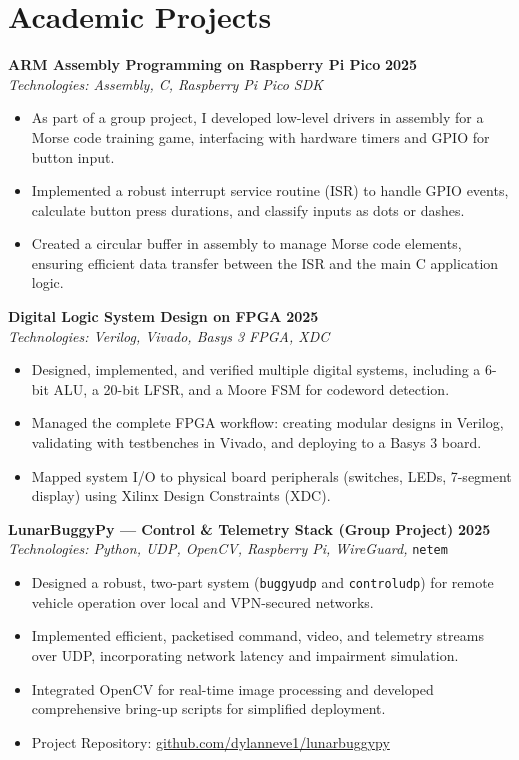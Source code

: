 \documentclass[10pt,a4paper]{article}
\begin{document}
\section*{Academic Projects}
\textbf{ARM Assembly Programming on Raspberry Pi Pico} \hfill \textbf{2025} \\
\textit{Technologies: Assembly, C, Raspberry Pi Pico SDK}
\begin{itemize}
    \item As part of a group project, I developed low-level drivers in assembly for a Morse code training game, interfacing with hardware timers and GPIO for button input.
    \item Implemented a robust interrupt service routine (ISR) to handle GPIO events, calculate button press durations, and classify inputs as dots or dashes.
    \item Created a circular buffer in assembly to manage Morse code elements, ensuring efficient data transfer between the ISR and the main C application logic.
\end{itemize}
\medskip
\textbf{Digital Logic System Design on FPGA} \hfill \textbf{2025} \\
\textit{Technologies: Verilog, Vivado, Basys 3 FPGA, XDC}
\begin{itemize}
    \item Designed, implemented, and verified multiple digital systems, including a 6-bit ALU, a 20-bit LFSR, and a Moore FSM for codeword detection.
    \item Managed the complete FPGA workflow: creating modular designs in Verilog, validating with testbenches in Vivado, and deploying to a Basys 3 board.
    \item Mapped system I/O to physical board peripherals (switches, LEDs, 7-segment display) using Xilinx Design Constraints (XDC).
\end{itemize}
\medskip
\textbf{LunarBuggyPy --- Control \& Telemetry Stack (Group Project)} \hfill \textbf{2025} \\
\textit{Technologies: Python, UDP, OpenCV, Raspberry Pi, WireGuard,} \texttt{netem}
\begin{itemize}
    \item Designed a robust, two-part system (\texttt{buggyudp} and \texttt{controludp}) for remote vehicle operation over local and VPN-secured networks.
    \item Implemented efficient, packetised command, video, and telemetry streams over UDP, incorporating network latency and impairment simulation.
    \item Integrated OpenCV for real-time image processing and developed comprehensive bring-up scripts for simplified deployment.
    \item Project Repository: \href{https://github.com/dylanneve1/lunarbuggypy}{github.com/dylanneve1/lunarbuggypy}
\end{itemize}
\end{document}
